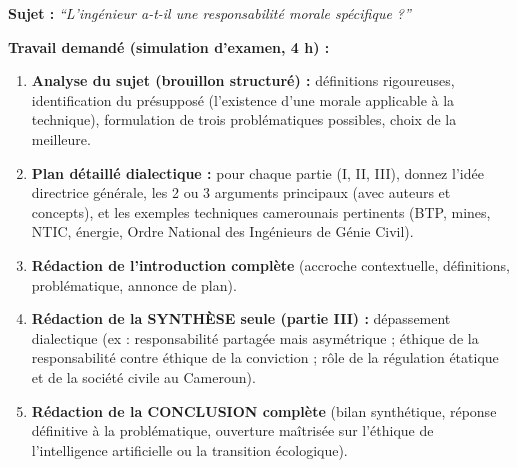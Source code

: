 \documentclass[11pt]{article}
\begin{document}
\begin{exercice}
\textbf{Sujet :} \emph{``L'ingénieur a-t-il une responsabilité morale spécifique ?''}

\textbf{Travail demandé (simulation d'examen, 4 h) :}
\begin{enumerate}
    \item \textbf{Analyse du sujet (brouillon structuré) :} définitions rigoureuses, identification du présupposé (l'existence d'une morale applicable à la technique), formulation de trois problématiques possibles, choix de la meilleure.
    \item \textbf{Plan détaillé dialectique :} pour chaque partie (I, II, III), donnez l'idée directrice générale, les 2 ou 3 arguments principaux (avec auteurs et concepts), et les exemples techniques camerounais pertinents (BTP, mines, NTIC, énergie, Ordre National des Ingénieurs de Génie Civil).
    \item \textbf{Rédaction de l'introduction complète} (accroche contextuelle, définitions, problématique, annonce de plan).
    \item \textbf{Rédaction de la SYNTHÈSE seule (partie III) :} dépassement dialectique (ex : responsabilité partagée mais asymétrique ; éthique de la responsabilité contre éthique de la conviction ; rôle de la régulation étatique et de la société civile au Cameroun).
    \item \textbf{Rédaction de la CONCLUSION complète} (bilan synthétique, réponse définitive à la problématique, ouverture maîtrisée sur l'éthique de l'intelligence artificielle ou la transition écologique).
\end{enumerate}
\end{exercice}
\end{document}
